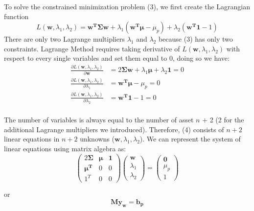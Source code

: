 \documentclass[12pt,titlepage,a4paper]{article}
\begin{document}
To solve the constrained minimization problem (3), we first create the Lagrangian function 
$$
L(\mathbf{w}, \lambda_1, \lambda_2) = \mathbf{w^T\Sigma w} + \lambda_1(\mathbf{w^T}\pmb{\mu} - \mu_p) + \lambda_2(\mathbf{w^T1} - 1)
$$
There are only two Lagrange multipliers $\lambda_1$ and $\lambda_2$ because (3) has only two constraints. Lagrange Method requires taking derivative of $L(\mathbf{w}, \lambda_1, \lambda_2)$ with respect to every single variables and set them equal to 0, doing so we have: 
\begin{equation}
\begin{split}
\frac{\partial L(\mathbf{w}, \lambda_1, \lambda_2)}{\partial \mathbf{w}} &= 2\mathbf{\Sigma w} + \lambda_1\pmb{\mu} + \lambda_2\mathbf{1} = 0 \\
\frac{\partial L(\mathbf{w}, \lambda_1, \lambda_2)}{\partial \lambda_1} &=  \mathbf{w^T}\pmb{\mu} - \mu_p = 0\\
\frac{\partial L(\mathbf{w}, \lambda_1, \lambda_2)}{\partial \lambda_2} &= \mathbf{w^T1} - 1 = 0\\
\end{split}
\end{equation}

The number of variables is always equal to the number of asset $n$ + 2 (2 for the additional Lagrange multipliers we introduced). Therefore, (4) consists of $n+2$ linear equations in $n+2$ unknowns ($\mathbf{w}, \lambda_1, \lambda_2$). We can represent the system of linear equations using matrix algebra as: 
\begin{equation*}
\begin{pmatrix} 2\mathbf{\Sigma} & \pmb{\mu} & \mathbf{1} \\ \mathbf{\mu^T} & 0 & 0 \\ 1^T & 0 & 0 \end{pmatrix} 
\begin{pmatrix}
\mathbf{w} \\ \lambda_1 \\ \lambda_2
\end{pmatrix}
 = 
\begin{pmatrix}
\mathbf{0} \\ \mu_p \\ 1
\end{pmatrix}
\end{equation*}

or 
$$
\mathbf{My_w} = \mathbf{b_p}
$$
\end{document}
